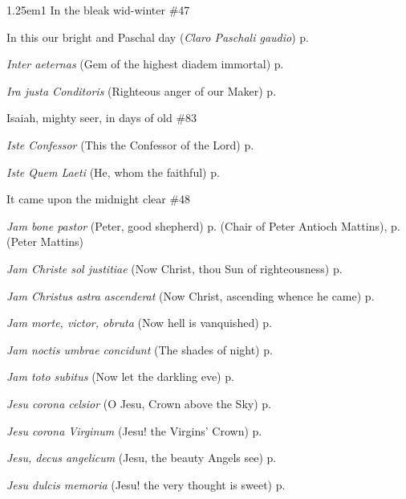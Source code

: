 \begin{hangparas}{1.25em}{1}
In the bleak wid-winter \dotfill \#47
\par\noindent
In this our bright and Paschal day (\textit{Claro Paschali gaudio}) \dotfill p. \pageref{ApostlesMattinsEaster}
\par\noindent
\textit{Inter aeternas} (Gem of the highest diadem immortal) \dotfill p. \pageref{BenedictMattins}
\par\noindent
\textit{Ira justa Conditoris} (Righteous anger of our Maker) \dotfill p. \pageref{PreciousBloodInvitatory}
\par\noindent
Isaiah, mighty seer, in days of old \dotfill \#83
\par\noindent
\textit{Iste Confessor} (This the Confessor of the Lord) \dotfill p. \pageref{ConfessorBishopEvensong}
\par\noindent
\textit{Iste Quem Laeti} (He, whom the faithful) \dotfill p. \pageref{JosephMattins}
\par\noindent
It came upon the midnight clear \dotfill \#48
\par\noindent
\textit{Jam bone pastor} (Peter, good shepherd) \dotfill p. \pageref{PeterAntiochMattins} (Chair of Peter Antioch Mattins), p. \pageref{PeterMattins} (Peter Mattins)
\par\noindent
\textit{Jam Christe sol justitiae} (Now Christ, thou Sun of righteousness) \dotfill p. \pageref{FirstLentMattinsHymn}
\par\noindent
\textit{Jam Christus astra ascenderat} (Now Christ, ascending whence he came) \dotfill p. \pageref{WhitsundayInvitatoryHymn}
\par\noindent
\textit{Jam morte, victor, obruta} (Now hell is vanquished) \dotfill p. \pageref{HolyRosaryMattins}
\par\noindent
\textit{Jam noctis umbrae concidunt} (The shades of night) \dotfill p. \pageref{ScholasticaMattins}
\par\noindent
\textit{Jam toto subitus} (Now let the darkling eve) \dotfill p. \pageref{SevenSorrowsEvensong}
\par\noindent
\textit{Jesu corona celsior} (O Jesu, Crown above the Sky) \dotfill p. \pageref{ConfessorNotBishopMattins}
\par\noindent
\textit{Jesu corona Virginum} (Jesu! the Virgins' Crown) \dotfill p. \pageref{VirginMattins}
\par\noindent
\textit{Jesu, decus angelicum} (Jesu, the beauty Angels see) \dotfill p. \pageref{HolyNameMattinsHymn}
\par\noindent
\textit{Jesu dulcis memoria} (Jesu! the very thought is sweet) \dotfill p. \pageref{HolyNameEvensongHymn}

\end{hangparas}
